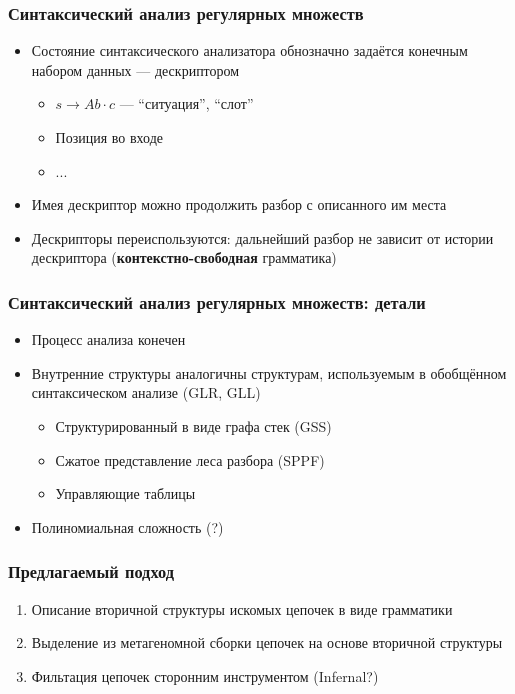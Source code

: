 \documentclass{beamer}
\begin{document}
\begin{frame}[fragile]
  \transwipe[direction=90]
  \frametitle{Синтаксический анализ регулярных множеств}
  \begin{itemize}
    \item Состояние синтаксического анализатора обнозначно задаётся конечным набором данных --- 
    дескриптором
    \begin{itemize}
       \item $s \rightarrow A b \cdot c$ --- ``ситуация'', ``слот''
       \item Позиция во входе
       \item ...
    \end{itemize}    
    \item Имея дескриптор можно продолжить разбор с описанного им места
    \item Дескрипторы переиспользуются: дальнейший разбор не зависит от истории дескриптора 
    (\textbf{контекстно-свободная} грамматика)
  \end{itemize}
\end{frame}


\begin{frame}
  \transwipe[direction=90]
  \frametitle{Синтаксический анализ регулярных множеств: детали}
  \begin{itemize}
    \item Процесс анализа конечен    
    \item Внутренние структуры аналогичны структурам, используемым в обобщённом синтаксическом 
    анализе (GLR, GLL)
    \begin{itemize}
       \item Структурированный в виде графа стек (GSS)
       \item Сжатое представление леса разбора (SPPF)
       \item Управляющие таблицы
    \end{itemize}
    \item Полиномиальная сложность (?)
  \end{itemize}
\end{frame}

\begin{frame}[fragile]
  \transwipe[direction=90]
  \frametitle{Предлагаемый подход}
  \begin{enumerate}
    \item Описание вторичной структуры искомых цепочек в виде грамматики
    \item Выделение из метагеномной сборки цепочек на основе вторичной структуры
    \item Фильтация цепочек сторонним инструментом (Infernal?)
  \end{enumerate}
\end{frame}
\end{document}
